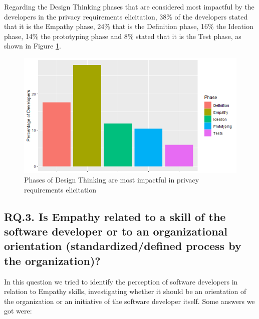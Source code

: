 \documentclass[conference]{IEEEtran}
\begin{document}
Regarding the Design Thinking phases that are considered most impactful by the developers in the privacy requirements elicitation, 38\% of the developers stated that it is the Empathy phase, 24\% that is the Definition phase, 16\% the Ideation phase, 14\% the prototyping phase and 8\% stated that it is the Test phase, as shown in Figure \ref{fig:impactos}. %

\begin{figure}
    \centering
    \includegraphics[width=5.5in]{Figures/RQ15.png}
    \caption{Phases of Design Thinking are most impactful in privacy requirements elicitation}
    \label{fig:impactos}
\end{figure}

\subsection{RQ.3. Is Empathy related to a skill of the software developer or to an organizational orientation (standardized/defined process by the organization)?}


In this question we tried to identify the perception of software developers in relation to Empathy skills, investigating whether it should be an orientation of the organization or an initiative of the software developer itself. Some answers we got were:
\end{document}
